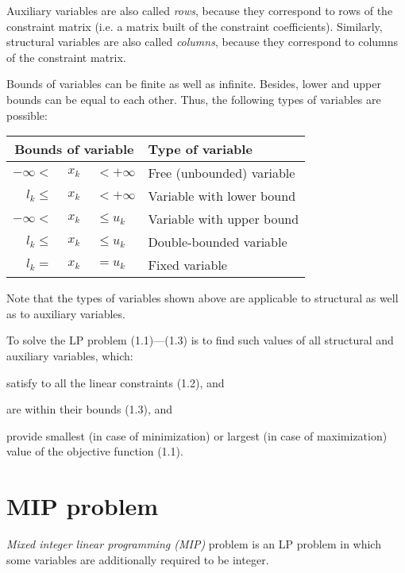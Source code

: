 Auxiliary variables are also called {\it rows}, because they correspond
to rows of the constraint matrix (i.e. a matrix built of the constraint
coefficients). Similarly, structural variables are also called
{\it columns}, because they correspond to columns of the constraint
matrix.

Bounds of variables can be finite as well as infinite. Besides, lower
and upper bounds can be equal to each other. Thus, the following types
of variables are possible:

\begin{center}
\begin{tabular}{r@{}c@{}ll}
\multicolumn{3}{c}{Bounds of variable} & Type of variable \\
\hline
$-\infty <$ &$\ x_k\ $& $< +\infty$ & Free (unbounded) variable \\
$l_k \leq$ &$\ x_k\ $& $< +\infty$  & Variable with lower bound \\
$-\infty <$ &$\ x_k\ $& $\leq u_k$  & Variable with upper bound \\
$l_k \leq$ &$\ x_k\ $& $\leq u_k$   & Double-bounded variable \\
$l_k =$ &$\ x_k\ $& $= u_k$         & Fixed variable \\
\end{tabular}
\end{center}

\noindent
Note that the types of variables shown above are applicable to
structural as well as to auxiliary variables.

To solve the LP problem (1.1)---(1.3) is to find such values of all
structural and auxiliary variables, which:


\Item{---}satisfy to all the linear constraints (1.2), and

\Item{---}are within their bounds (1.3), and

\Item{---}provide smallest (in case of minimization) or largest (in
case of maximization) value of the objective function (1.1).

\section{MIP problem}

{\it Mixed integer linear programming (MIP)} problem is an LP problem
in which some variables are additionally required to be integer.

